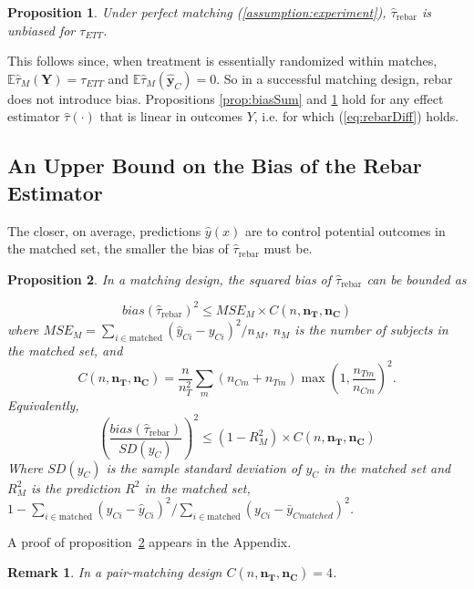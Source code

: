 \documentclass[12pt]{article}\usepackage[]{graphicx}\usepackage[]{color}
\newcommand{\ncm}{n_{Cm}}
\newcommand{\ntm}{n_{Tm}}
\newcommand{\est}{\hat{\tau}_{\text{rebar}}}
\newcommand{\EE}{\mathbb{E}}
\newcommand{\Match}{M}
\newcommand{\covVec}{x}
\newtheorem{prop}{Proposition}
\newtheorem{remark}{Remark}
\begin{document}
\begin{prop}\label{prop:noBias}
Under perfect matching (\ref{assumption:experiment}), $\est$ is unbiased for $\tau_{ETT}$.
\end{prop}
This follows since, when treatment is essentially randomized within matches, $\EE \hat{\tau}_\Match (\bm{Y})=\tau_{ETT}$ and $\EE\hat{\tau}_\Match (\bm{\hat{y}}_C)=0$.
So in a successful matching design, rebar does not introduce bias.
Propositions \ref{prop:biasSum} and \ref{prop:noBias} hold for any
effect estimator $\hat{\tau} (\cdot)$ that is linear in outcomes $Y$,
i.e. for which (\ref{eq:rebarDiff}) holds.

\subsection{An Upper Bound on the Bias of the Rebar Estimator}\label{sec:upperBound}


The closer, on average, predictions $\hat{y}(\covVec)$ are to control potential outcomes in the matched set, the smaller the bias of $\est$ must be.

\begin{prop}\label{biasBound}
In a matching design, the squared bias of $\est$ can be bounded as

\begin{equation*}
bias(\est)^2\le MSE_{\Match}\times C(n,\bm{n_T},\bm{n_C})
\end{equation*}
where $MSE_{\Match}=\sum_{i\in \text{matched}} (\hat{y}_{Ci}-y_{Ci})^2/n_{\Match}$,   $n_{\Match}$ is the number of subjects in the matched set, and
\begin{equation*}
C(n,\bm{n_T},\bm{n_C})=\frac{n}{n_T^2}\sum_m
  (\ncm+\ntm) \max\left(1,\frac{\ntm}{\ncm}\right)^2.
\end{equation*}
Equivalently,
\begin{equation*}
\left(\frac{bias(\est)}{SD(y_C)}\right)^2\le(1-R^2_{\Match})\times C(n,\bm{n_T},\bm{n_C})
\end{equation*}
Where $SD(y_C)$ is the sample standard deviation of $y_C$ in the matched set and $R^2_{\Match}$ is the prediction $R^2$ in the matched set, $1-\sum_{i\in \text{matched}} (y_{Ci}-\hat{y}_{Ci})^2/\sum_{i\in \text{matched}} (y_{Ci}-\bar{y}_{Cmatched})^2$.
\end{prop}

A proof of proposition~\ref{biasBound} appears in the Appendix.


\begin{remark}\label{biasBoundRemark}
In a pair-matching design $C(n,\bm{n_T},\bm{n_C})=4$.

\end{remark}
\end{document}
